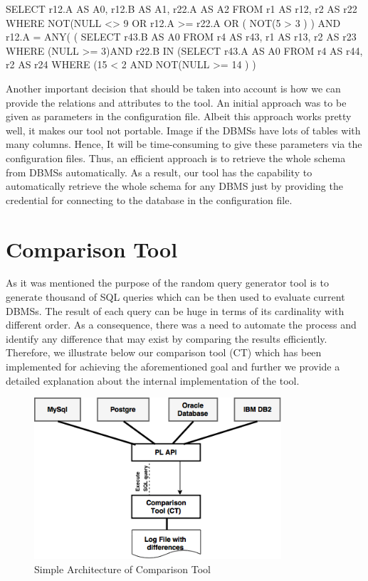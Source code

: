 SELECT r12.A AS A0, r12.B AS A1, r22.A AS A2 
FROM r1 AS r12, r2 AS r22
WHERE NOT(NULL <> 9 OR r12.A >= r22.A OR ( NOT(5 > 3 )  ) 
AND r12.A = ANY( (	SELECT r43.B AS A0
			FROM r4 AS r43, r1 AS r13, r2 AS r23
			WHERE (NULL >= 3)AND r22.B IN (SELECT r43.A AS A0
							FROM r4 AS r44, r2 AS r24
							WHERE (15 < 2 AND NOT(NULL >= 14 ) ) 



	Another important decision that should be taken into account is how we can provide the relations and attributes to the tool. An initial approach was to be given as parameters in the configuration file. Albeit this approach works pretty well, it makes our tool not portable. Image if the DBMSs have lots of tables with many columns. Hence, It will be time-consuming to give these parameters via the configuration files. Thus, an efficient approach is to retrieve the whole schema from DBMSs automatically. As a result, our tool has the capability to automatically retrieve the whole schema for any DBMS just by providing the credential for connecting to the database in the configuration file.

\section{Comparison Tool} 
As it was mentioned the purpose of the random query generator tool is to generate thousand of SQL queries which can be then used to evaluate current DBMSs. The result of each query can be huge in terms of its cardinality with different order. As a consequence, there was a need to automate the process and identify any difference that may exist by comparing the results efficiently. Therefore, we illustrate below our comparison tool (CT) which has been implemented for achieving the aforementioned goal and further we provide a detailed explanation about the internal implementation of the tool.  

 \begin{figure} 
      \centering
      \includegraphics[width=\textwidth,height=6cm]{Images/Chapter4/2-ComparisonTool}
      \caption{Simple Architecture of Comparison Tool}
      \label{fig:counting-methods}
  \end{figure}

